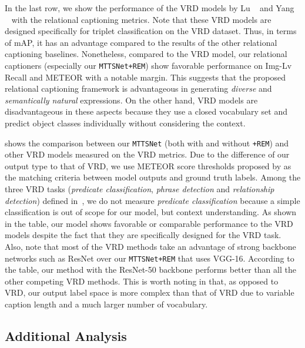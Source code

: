 In the last row, we show the performance of the VRD models by Lu \etal~\cite{lu2016visual} and Yang \etal~\cite{yang2018shuffle} with the relational captioning metrics.
Note that {these VRD models are}
designed specifically for triplet classification on the VRD dataset.
Thus, in terms of mAP, 
it has an advantage compared to the results of the other relational captioning baselines. 
{Nonetheless, compared to the VRD model, {our} relational captioners (especially our \texttt{MTTSNet+REM}) show favorable performance on Img-Lv Recall and METEOR with a notable margin.
This suggests that the proposed relational captioning framework is advantageous in generating \emph{diverse} and \emph{semantically natural} expressions.
On the other hand,} VRD models are disadvantageous in these aspects because they use {a} closed vocabulary set and predict object classes individually without considering the context.



 shows the comparison between our \texttt{MTTSNet} ({both with and without \texttt{+REM}}) and other VRD models 
measured on {the} VRD metrics.
Due to the difference of our output type to that of VRD, we use METEOR score thresholds proposed by \cite{johnson2016densecap} as the matching criteria {between model outputs and ground truth labels}. 
{Among the three VRD tasks (\emph{predicate classification}, \emph{phrase detection} and \emph{relationship detection}) defined in~\cite{lu2016visual}, we do not measure \emph{predicate classification} because a simple classification is out of scope for our model,} {but context understanding.}
As shown in the table, our model shows favorable {or comparable} performance to {the VRD} models despite {the fact} that they are specifically designed for the VRD task.
{Also, note that most of the VRD methods take an advantage of strong backbone networks such as ResNet over our \texttt{MTTSNet+REM} that uses VGG-16.
According to the table, our method with the ResNet-50 backbone performs better than all the other competing VRD methods.
}
This is worth noting in that, as opposed to VRD, our output label space is more complex than that of VRD due to variable caption length {and {a much larger number} 
of vocabulary}.




\subsection{Additional Analysis}



